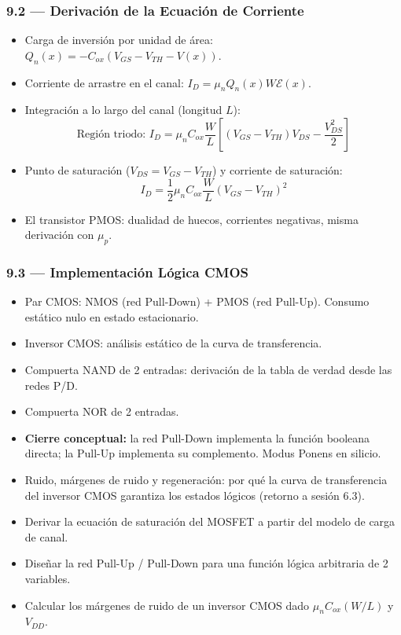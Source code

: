 \documentclass[11pt, letterpaper]{article}
\begin{document}
\subsubsection{9.2 — Derivación de la Ecuación de Corriente}
\begin{itemize}
  \item Carga de inversión por unidad de área: $Q_n(x)=-C_{ox}(V_{GS}-V_{TH}-V(x))$.
  \item Corriente de arrastre en el canal: $I_D=\mu_n Q_n(x)W\mathcal{E}(x)$.
  \item Integración a lo largo del canal (longitud $L$):
    \[\text{Región triodo: }I_D=\mu_n C_{ox}\frac{W}{L}\!\left[(V_{GS}-V_{TH})V_{DS}-\frac{V_{DS}^2}{2}\right]\]
  \item Punto de saturación ($V_{DS}=V_{GS}-V_{TH}$) y corriente de saturación:
    \[I_D=\frac{1}{2}\mu_n C_{ox}\frac{W}{L}(V_{GS}-V_{TH})^2\]
  \item El transistor PMOS: dualidad de huecos, corrientes negativas, misma derivación con $\mu_p$.
\end{itemize}

\subsubsection{9.3 — Implementación Lógica CMOS}
\begin{itemize}
  \item Par CMOS: NMOS (red Pull-Down) + PMOS (red Pull-Up). Consumo estático nulo en estado estacionario.
  \item Inversor CMOS: análisis estático de la curva de transferencia.
  \item Compuerta NAND de 2 entradas: derivación de la tabla de verdad desde las redes P/D.
  \item Compuerta NOR de 2 entradas.
  \item \textbf{Cierre conceptual:} la red Pull-Down implementa la función booleana directa; la Pull-Up implementa su complemento. Modus Ponens en silicio.
  \item Ruido, márgenes de ruido y regeneración: por qué la curva de transferencia del inversor CMOS garantiza los estados lógicos (retorno a sesión 6.3).
\end{itemize}

\begin{objetivos}
\begin{itemize}
  \item Derivar la ecuación de saturación del MOSFET a partir del modelo de carga de canal.
  \item Diseñar la red Pull-Up / Pull-Down para una función lógica arbitraria de 2 variables.
  \item Calcular los márgenes de ruido de un inversor CMOS dado $\mu_n C_{ox}(W/L)$ y $V_{DD}$.
\end{itemize}
\end{objetivos}
\end{document}
